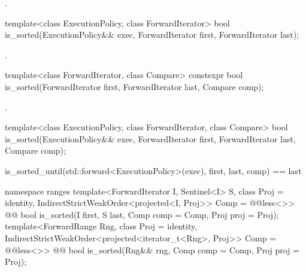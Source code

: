 \begin{itemdescr}
\pnum
\returns {}.
\end{itemdescr}

%
\begin{itemdecl}
template<class ExecutionPolicy, class ForwardIterator>
  bool is_sorted(ExecutionPolicy&& exec,
                 ForwardIterator first, ForwardIterator last);
\end{itemdecl}

\begin{itemdescr}
\pnum
\returns {}.
\end{itemdescr}

%
\begin{itemdecl}
template<class ForwardIterator, class Compare>
  constexpr bool is_sorted(ForwardIterator first, ForwardIterator last,
                           Compare comp);
\end{itemdecl}

\begin{itemdescr}
\pnum
\returns {}.
\end{itemdescr}


%
\begin{itemdecl}
template<class ExecutionPolicy, class ForwardIterator, class Compare>
  bool is_sorted(ExecutionPolicy&& exec,
                 ForwardIterator first, ForwardIterator last,
                 Compare comp);
\end{itemdecl}

\begin{itemdescr}
\pnum
\returns
\begin{codeblock}
is_sorted_until(std::forward<ExecutionPolicy>(exec), first, last, comp) == last
\end{codeblock}
\end{itemdescr}

\begin{addedblock}
%
\begin{itemdecl}
namespace ranges {
  template<ForwardIterator I, Sentinel<I> S, class Proj = identity,
      IndirectStrictWeakOrder<projected<I, Proj>> Comp = @@less<>>
    @@ bool is_sorted(I first, S last, Comp comp = Comp{}, Proj proj = Proj{});
  template<ForwardRange Rng, class Proj = identity,
      IndirectStrictWeakOrder<projected<iterator_t<Rng>, Proj>> Comp = @@less<>>
    @@ bool is_sorted(Rng&& rng, Comp comp = Comp{}, Proj proj = Proj{});
}
\end{itemdecl}

\begin{itemdescr}
\pnum
\returns {}
\end{itemdescr}
\end{addedblock}

